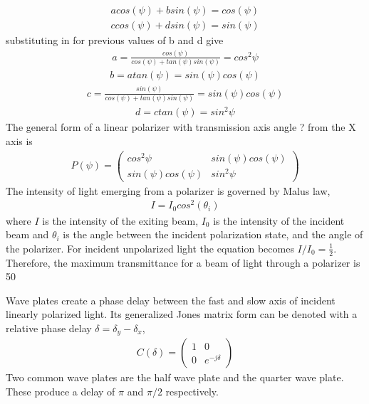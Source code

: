 \begin{align}
    acos(\psi) + bsin(\psi) = cos(\psi) \\
    ccos(\psi) + dsin(\psi) = sin(\psi)
\end{align}
%
substituting in for previous values of b and d give
%
\begin{align}
    a = \frac{cos(\psi)}{cos(\psi) + tan(\psi)sin(\psi)} = cos^2\psi
\end{align}
\begin{align}
    b = atan(\psi) = sin(\psi)cos(\psi)
\end{align}
\begin{align}
    c = \frac{sin(\psi)}{cos(\psi) + tan(\psi)sin(\psi)} = sin(\psi)cos(\psi)
\end{align}
\begin{align}
    d = ctan(\psi) = sin^2\psi
\end{align}
%
The general form of a linear polarizer with transmission axis angle ? from the X axis is
%
\begin{align}
    P(\psi) =
    \begin{pmatrix}
        cos^2\psi & sin(\psi)cos(\psi) \\
        sin(\psi)cos(\psi) & sin^2\psi
    \end{pmatrix}
\end{align}
%
The intensity of light emerging from a polarizer is governed by Malus law,
%
\begin{align}
    I = I_0cos^2(\theta_i)
\end{align}
%
where $I$ is the intensity of the exiting beam, $I_0$ is the intensity of the incident beam and $\theta_i$ is the angle between the incident polarization state, and the angle of the polarizer.   For incident unpolarized light the equation becomes $I / I_0 = \frac{1}{2}$.  Therefore, the maximum transmittance for a beam of light through a polarizer is 50%

Wave plates create a phase delay between the fast and slow axis of incident linearly polarized light.  Its generalized Jones matrix form can be denoted with a relative phase delay $\delta=\delta_y-\delta_x$,
\begin{align}
    C(\delta) =
    \begin{pmatrix}
        1 & 0 \\
        0 & e^{-j\delta}
    \end{pmatrix}
\end{align}
%
Two common wave plates are the half wave plate and the quarter wave plate.  These produce a delay of $\pi$ and $\pi/2$ respectively.

